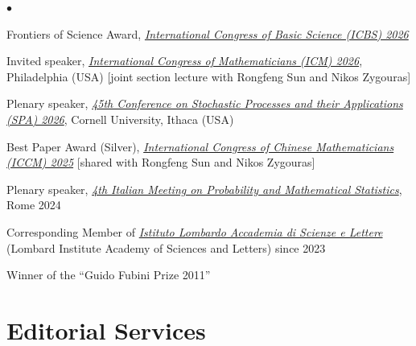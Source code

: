\documentclass[a4paper,11pt,oneside]{amsart}
\newenvironment{myitemize}{%
\begin{list}{$\bullet$}%
 	{%
	\setlength{\itemsep}{0.3em}%
	\setlength{\topsep}{0.3em}%
	\setlength{\partopsep}{0em}%
	\setlength{\parsep}{0em}%
	\setlength{\parskip}{0em}%
	\setlength\leftmargin{1.5em}%
	\setlength\labelwidth{1.1em}%
	\setlength{\labelsep}{0.4em}%
	}%
	}%
{\end{list}}
\renewenvironment{itemize}{
\begin{myitemize}}%
{\end{myitemize}}
\begin{document}
\begin{itemize}
\item Frontiers of Science Award, 
\href{https://www.icbs.cn/site/?pageId=38be333f-cd8a-4593-ab24-8a15e91b4115}{\emph{International Congress of Basic Science (ICBS) 2026}}


\item Invited speaker,
\href{https://www.icm2026.org/event/ac193975-5d24-4628-8c30-ddb23de19a8b/speakers}{\emph{International Congress of Mathematicians (ICM) 2026}},
Philadelphia (USA)
[joint section lecture with Rongfeng Sun and Nikos Zygouras]

\item Plenary speaker,
\href{https://events.ces.scl.cornell.edu/event/7d2eb9fb-e4e1-4163-ab03-bb8419050b73/summary?tm=c314K3S6DBKCVokeOwfM4-e56vCGWx3RSuAt0fFOZu0}{\emph{45th Conference on Stochastic Processes and their Applications (SPA) 2026}},
Cornell University, Ithaca (USA)

\item Best Paper Award (Silver), 
\href{https://iccm.simis.cn/iccm2025/site/awards/best-paper-award/}{\emph{International Congress of Chinese Mathematicians (ICCM) 2025}}
[shared with Rongfeng Sun and Nikos Zygouras]

\item Plenary speaker, \href{https://probabilityrome2024.it/plenary-speakers/}{\emph{4th Italian Meeting on
Probability and Mathematical Statistics}}, Rome 2024

\item Corresponding Member of \href{https://istitutolombardo.it/istituzione/accademico/488}{\emph{Istituto Lombardo Accademia di Scienze e Lettere}} (Lombard Institute Academy of Sciences and Letters) since 2023

\item Winner of the ``Guido Fubini Prize 2011''
\end{itemize}

\section{Editorial Services}
\end{document}
